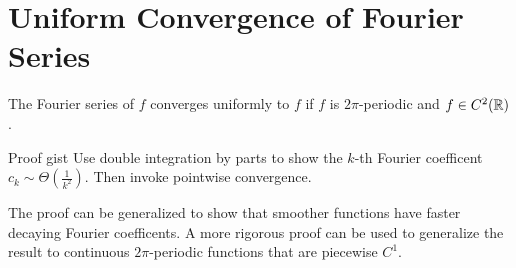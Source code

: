 \section{Uniform Convergence of Fourier Series}
\begin{thm}
    The Fourier series of $f$ converges uniformly to $f$ if $f$ is $2\pi$-periodic and $f \in C^2({\mathbb R})$.
\end{thm}
\begin{details}{Proof gist}
    Use double integration by parts to show the $k$-th Fourier coefficent $c_k \sim \Theta( \frac{1}{k^2})$. Then invoke pointwise convergence.
\end{details}
\begin{remark}
    The proof can be generalized to show that smoother functions have faster decaying Fourier coefficents. A more rigorous proof can be used to generalize the result to continuous $2\pi$-periodic functions that are piecewise $C^1$.
\end{remark}

